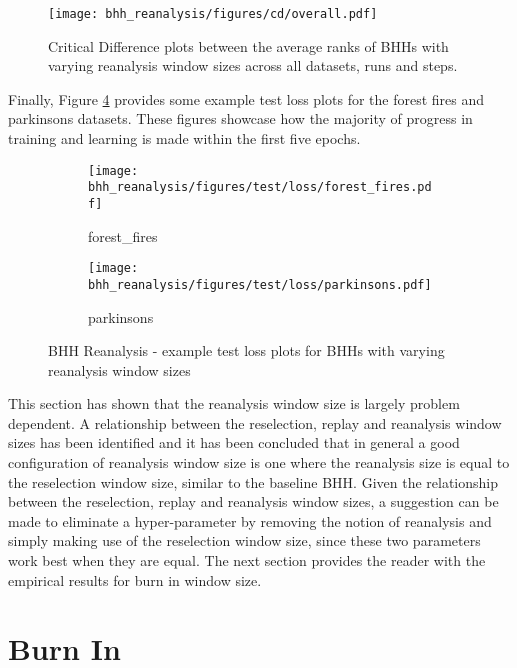 \begin{figure}[htbp]
	\centering
	\texttt{[image: bhh\_reanalysis/figures/cd/overall.pdf]}
	\caption{Critical Difference plots between the average ranks of \Acsp{BHH} with varying reanalysis window sizes across all datasets, runs and steps.}
	\label{fig:results:reanalysis:descriptive:cd}
\end{figure}

Finally, Figure \ref{fig:results:reanalysis:figures:loss} provides some example test loss plots for the forest fires and parkinsons datasets. These figures showcase how the majority of progress in training and learning is made within the first five epochs.


\begin{figure}[htbp]
	\begin{subfigure}{0.5\textwidth}
		\centering
		\texttt{[image: bhh\_reanalysis/figures/test/loss/forest\_fires.pdf]}
		\caption{forest\_fires}
		\label{fig:results:reanalysis:figures:loss1}
	\end{subfigure}
	\begin{subfigure}{0.5\textwidth}
		\centering
		\texttt{[image: bhh\_reanalysis/figures/test/loss/parkinsons.pdf]}
		\caption{parkinsons}
		\label{fig:results:reanalysis:figures:loss2}
	\end{subfigure}
	\caption{\Acs{BHH} Reanalysis - example test loss plots for \Acsp{BHH} with varying reanalysis window sizes}
	\label{fig:results:reanalysis:figures:loss}
\end{figure}

This section has shown that the reanalysis window size is largely problem dependent. A relationship between the reselection, replay and reanalysis window sizes has been identified and it has been concluded that in general a good configuration of reanalysis window size is one where the reanalysis size is equal to the reselection window size, similar to the baseline \Ac{BHH}. Given the relationship between the reselection, replay and reanalysis window sizes, a suggestion can be made to eliminate a hyper-parameter by removing the notion of reanalysis and simply making use of the  reselection window size, since these two parameters work best when they are equal. The next section provides the reader with the empirical results for burn in window size.



\section{Burn In}
\label{sec:results:burn_in}

